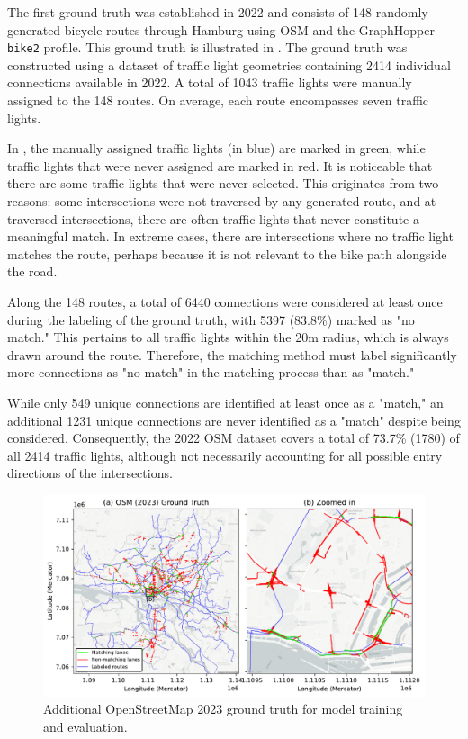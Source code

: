 The first ground truth was established in 2022 and consists of 148 randomly generated bicycle routes through Hamburg using OSM and the GraphHopper \texttt{bike2} profile. This ground truth is illustrated in . The ground truth was constructed using a dataset of traffic light geometries containing 2414 individual connections available in 2022. A total of 1043 traffic lights were manually assigned to the 148 routes. On average, each route encompasses seven traffic lights.

In , the manually assigned traffic lights (in blue) are marked in green, while traffic lights that were never assigned are marked in red. It is noticeable that there are some traffic lights that were never selected. This originates from two reasons: some intersections were not traversed by any generated route, and at traversed intersections, there are often traffic lights that never constitute a meaningful match. In extreme cases, there are intersections where no traffic light matches the route, perhaps because it is not relevant to the bike path alongside the road.

Along the 148 routes, a total of 6440 connections were considered at least once during the labeling of the ground truth, with 5397 (83.8\%) marked as "no match." This pertains to all traffic lights within the 20m radius, which is always drawn around the route. Therefore, the matching method must label significantly more connections as "no match" in the matching process than as "match."

While only 549 unique connections are identified at least once as a "match," an additional 1231 unique connections are never identified as a "match" despite being considered. Consequently, the 2022 OSM dataset covers a total of 73.7\% (1780) of all 2414 traffic lights, although not necessarily accounting for all possible entry directions of the intersections.

\begin{figure}[htbp]
\centering 
\includegraphics[width=\linewidth]{images/matching-ground-truth-osm.pdf}
\caption{Additional OpenStreetMap 2023 ground truth for model training and evaluation.}
\label{fig:matching-ground-truth-osm}
\end{figure}

